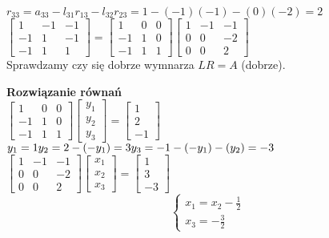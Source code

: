 \documentclass{article}
\begin{document}
$r_{33}=a_{33}-l_{31}r_{13}-l_{32}r_{23}=1-(-1)(-1)-(0)(-2)=2$\\
$\begin{bmatrix} 1 & -1 & -1 \\ -1 & 1 & -1 \\ -1 & 1 & 1 \end{bmatrix}=\begin{bmatrix} 1 & 0 & 0 \\ -1 & 1 & 0 \\ -1 & 1 & 1 \end{bmatrix} \begin{bmatrix} 1 & -1 & -1 \\ 0 & 0 & -2 \\ 0 & 0 & 2 \end{bmatrix}$\\
Sprawdzamy czy się dobrze wymnarza $LR=A$ (dobrze).

\textbf{Rozwiązanie równań}\\
$\begin{bmatrix} 1 & 0 & 0 \\ -1 & 1 & 0 \\ -1 & 1 & 1 \end{bmatrix}\begin{bmatrix} y_1 \\ y_2 \\ y_3 \end{bmatrix} = \begin{bmatrix} 1 \\ 2 \\ -1 \end{bmatrix}$\\
$y_1=1\\y_2=2-(-y_1)=3\\y_3=-1-(-y_1)-(y_2)=-3$\\
$\begin{bmatrix} 1 & -1 & -1 \\ 0 & 0 & -2 \\ 0 & 0 & 2 \end{bmatrix}\begin{bmatrix} x_1 \\ x_2 \\ x_3 \end{bmatrix} = \begin{bmatrix} 1 \\ 3 \\ -3 \end{bmatrix}$\\

\begin{equation*}\begin{cases}
    x_1=x_2-\frac{1}{2}\\
    x_3=-\frac{3}{2}
\end{cases}\end{equation*}
\end{document}
